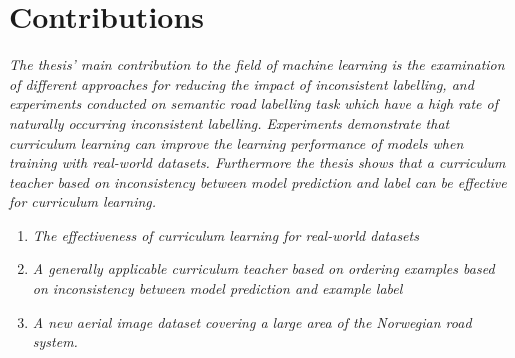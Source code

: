 \section{Contributions}
\label{sec:IntroContributions}
{\it
The thesis' main contribution to the field of machine learning  is the examination of different approaches for reducing the impact of inconsistent labelling, and experiments conducted on semantic road labelling task which have a high rate of naturally occurring inconsistent labelling. Experiments demonstrate that curriculum learning can improve the learning performance of models when training with real-world datasets. Furthermore the thesis shows that a curriculum teacher based on inconsistency between model prediction and label can be effective for curriculum learning.}

\begin{enumerate}
\item {\it The effectiveness of curriculum learning for real-world datasets}
\item {\it A generally applicable curriculum teacher based on ordering examples based on inconsistency between model prediction and example label}
\item {\it A new aerial image dataset covering a large area of the Norwegian road system.}
\end{enumerate}